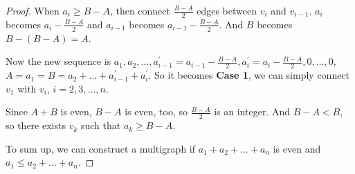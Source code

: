 \begin{proof}
    When $a_i \geq B - A$, then connect $\frac{B-A}{2}$ edges between $v_i$ and $v_{i-1}$. $a_i$ becomes $a_i - \frac{B-A}{2}$ and $a_{i-1}$ becomes $a_{i-1} - \frac{B-A}{2}$. And $B$ becomes $B - (B-A)=A$.

    Now the new sequence is $a_1, a_2, \dots, a_{i-1}^\prime = a_{i-1} - \frac{B-A}{2}, a_i^\prime = a_i - \frac{B-A}{2}, 0, \dots, 0$, $A = a_1 = B = a_2 + \dots + a_{i-1}^\prime + a_i^\prime$. So it becomes \textbf{Case 1}, we can simply connect $v_1$ with $v_i$, $i=2,3,\dots,n$.

    Since $A+B$ is even, $B-A$ is even, too, so $\frac{B-A}{2}$ is an integer. And $B-A < B$, so there exists $v_k$ such that $a_k \geq B - A$.

    To sum up, we can construct a multigraph if $a_1 + a_2 + \dots + a_n$ is even and $a_1 \leq a_2 + \dots + a_n$.

\end{proof}

